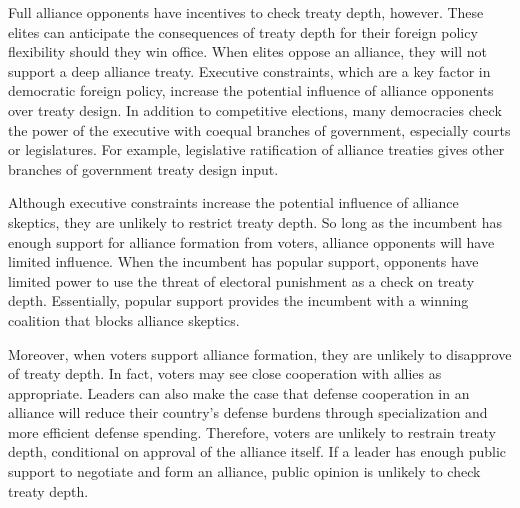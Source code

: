 \documentclass[12pt]{article}
\begin{document}
Full alliance opponents have incentives to check treaty depth, however.
These elites can anticipate the consequences of treaty depth for their foreign policy flexibility should they win office.
When elites oppose an alliance, they will not support a deep alliance treaty.  
Executive constraints, which are a key factor in democratic foreign policy, increase the potential influence of alliance opponents over treaty design.   
In addition to competitive elections, many democracies check the power of the executive with coequal branches of government, especially courts or legislatures.
For example, legislative ratification of alliance treaties gives other branches of government treaty design input. 


Although executive constraints increase the potential influence of alliance skeptics, they are unlikely to restrict treaty depth. 
So long as the incumbent has enough support for alliance formation from voters, alliance opponents will have limited influence. 
When the incumbent has popular support, opponents have limited power to use the threat of electoral punishment as a check on treaty depth. 
Essentially, popular support provides the incumbent with a winning coalition that blocks alliance skeptics. 




Moreover, when voters support alliance formation, they are unlikely to disapprove of treaty depth.
In fact, voters may see close cooperation with allies as appropriate. 
Leaders can also make the case that defense cooperation in an alliance will reduce their country's defense burdens through specialization and more efficient defense spending.  
Therefore, voters are unlikely to restrain treaty depth, conditional on approval of the alliance itself. 
If a leader has enough public support to negotiate and form an alliance, public opinion is unlikely to check treaty depth. 
\end{document}
